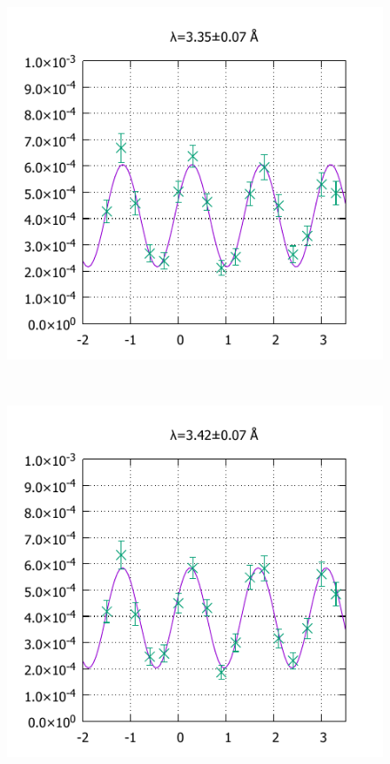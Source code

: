 \begin{figure}[H]
\begin{minipage}{0.33\hsize}
\includegraphics[width=\imgwidth]{phase_shifter/wl/wlf3.pdf}
\end{minipage}\\
\begin{minipage}{0.33\hsize}
\includegraphics[width=\imgwidth]{phase_shifter/wl/wlf12.pdf}
\end{minipage}

\end{figure}
